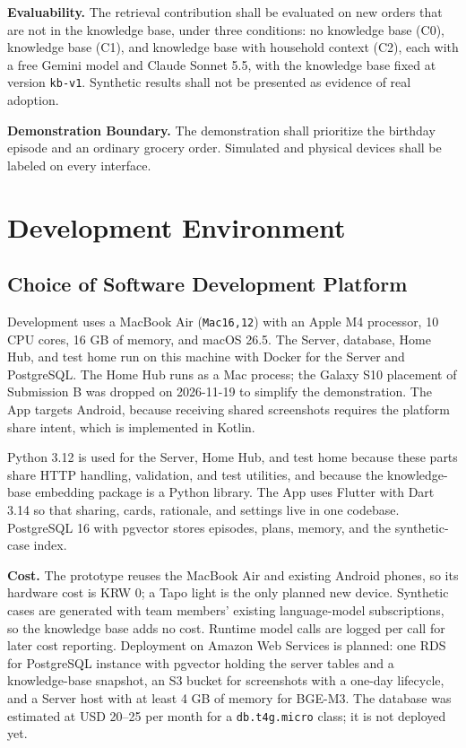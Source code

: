 \documentclass[conference]{IEEEtran}
\begin{document}
\textbf{Evaluability.} The retrieval contribution shall be evaluated on new orders that are not in the knowledge base, under three conditions: no knowledge base (C0), knowledge base (C1), and knowledge base with household context (C2), each with a free Gemini model and Claude Sonnet 5.5, with the knowledge base fixed at version \texttt{kb-v1}. Synthetic results shall not be presented as evidence of real adoption.

\textbf{Demonstration Boundary.} The demonstration shall prioritize the birthday episode and an ordinary grocery order. Simulated and physical devices shall be labeled on every interface.

\section{Development Environment}
\subsection{Choice of Software Development Platform}
Development uses a MacBook Air (\texttt{Mac16,12}) with an Apple M4 processor, 10 CPU cores, 16 GB of memory, and macOS 26.5. The Server, database, Home Hub, and test home run on this machine with Docker for the Server and PostgreSQL. The Home Hub runs as a Mac process; the Galaxy S10 placement of Submission B was dropped on 2026-11-19 to simplify the demonstration. The App targets Android, because receiving shared screenshots requires the platform share intent, which is implemented in Kotlin.

Python 3.12 is used for the Server, Home Hub, and test home because these parts share HTTP handling, validation, and test utilities, and because the knowledge-base embedding package is a Python library. The App uses Flutter with Dart 3.14 so that sharing, cards, rationale, and settings live in one codebase. PostgreSQL 16 with pgvector stores episodes, plans, memory, and the synthetic-case index.

\textbf{Cost.} The prototype reuses the MacBook Air and existing Android phones, so its hardware cost is KRW 0; a Tapo light is the only planned new device. Synthetic cases are generated with team members' existing language-model subscriptions, so the knowledge base adds no cost. Runtime model calls are logged per call for later cost reporting. Deployment on Amazon Web Services is planned: one RDS for PostgreSQL instance with pgvector holding the server tables and a knowledge-base snapshot, an S3 bucket for screenshots with a one-day lifecycle, and a Server host with at least 4 GB of memory for BGE-M3. The database was estimated at USD 20--25 per month for a \texttt{db.t4g.micro} class; it is not deployed yet.
\end{document}
